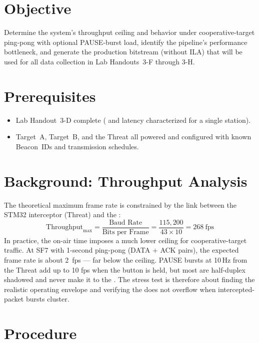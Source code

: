 \documentclass[11pt,letterpaper]{article}
\begin{document}

\section{Objective}
Determine the system's throughput ceiling and \FIFO{} behavior under cooperative-target ping-pong with optional PAUSE-burst load, identify the pipeline's performance bottleneck, and generate the production bitstream (without \mbox{ILA}) that will be used for all data collection in Lab Handouts~3-F through 3-H.

\section{Prerequisites}
\begin{itemize}[leftmargin=2em]
	\item Lab Handout~3-D complete (\PER{} and latency characterized for a single station).
	\item Target~A, Target~B, and the Threat all powered and configured with known Beacon~\mbox{ID}s and transmission schedules.
\end{itemize}

\section{Background: Throughput Analysis}

The theoretical maximum frame rate is constrained by the \UART{} link between the STM32 interceptor (Threat) and the \FPGA{}:
\[
	\text{Throughput}_{\text{max}} = \frac{\text{Baud Rate}}{\text{Bits per Frame}} = \frac{115{,}200}{43 \times 10} = 268~\text{fps}
\]
In practice, the \RF{} on-air time imposes a much lower ceiling for cooperative-target traffic. At SF7 with 1-second ping-pong (DATA + ACK pairs), the expected frame rate is about 2~fps --- far below the \UART{} ceiling. PAUSE bursts at 10\,Hz from the Threat add up to 10 fps when the button is held, but most are half-duplex shadowed and never make it to the \FPGA{}. The stress test is therefore about finding the realistic operating envelope and verifying the \FIFO{} does not overflow when intercepted-packet bursts cluster.

\section{Procedure}
\end{document}
